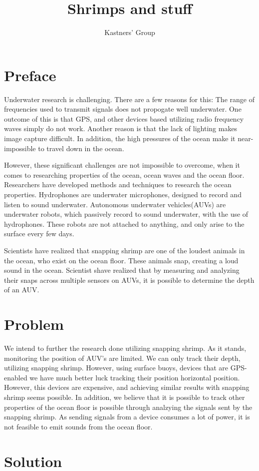 \documentclass[11pt]{article}
\begin{document}
\title{Shrimps and stuff}
\author{Kastners' Group}
\maketitle

\section{Preface}
	Underwater research is challenging. There are a few reasons for this: The range of frequencies used to transmit signals does not propogate well underwater. One outcome of this is that GPS, and other devices based utilizing radio frequency waves simply do not work. Another reason is that the lack of lighting makes image capture difficult. In addition, the high pressures of the ocean make it near-impossible to travel down in the ocean. 
	
	However, these significant challenges are not impossible to overcome, when it comes to researching properties of the ocean, ocean waves and the ocean floor. Researchers have developed methods and techniques to research the ocean properties. Hydrophones are underwater microphones, designed to record and listen to sound underwater. Autonomous underwater vehicles(AUVs) are underwater robots, which passively record to sound underwater, with the use of hydrophones. These robots are not attached to anything, and only arise to the surface every few days. 
	
	Scientists have realized that snapping shrimp are one of the loudest animals in the ocean, who exist on the ocean floor. These animals snap, creating a loud sound in the ocean. Scientist shave  realized that by measuring and analyzing their snaps across multiple sensors on AUVs, it is possible to determine the depth of an AUV. 

\section{Problem}

	We intend to further the research done utilizing snapping shrimp. As it stands, monitoring the position of AUV's are limited. We can only track their depth, utilizing snapping shrimp. However, using surface buoys, devices that are GPS-enabled we have much better luck tracking their position horizontal position. However, this devices are expensive, and achieving similar results with snapping shrimp seems possible. In addition, we believe that it is possible to track other properties of the ocean floor is possible through analzying the signals sent by the snapping shrimp. As sending signals from a device consumes a lot of power, it is not feasible to emit sounds from the ocean floor.  
\section{Solution}
\end{document}
